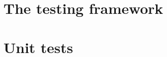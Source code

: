 \documentclass[main.tex]{subfiles}
\begin{document}
	
	\section{The testing framework}
	\section{Unit tests}
	
\end{document}

